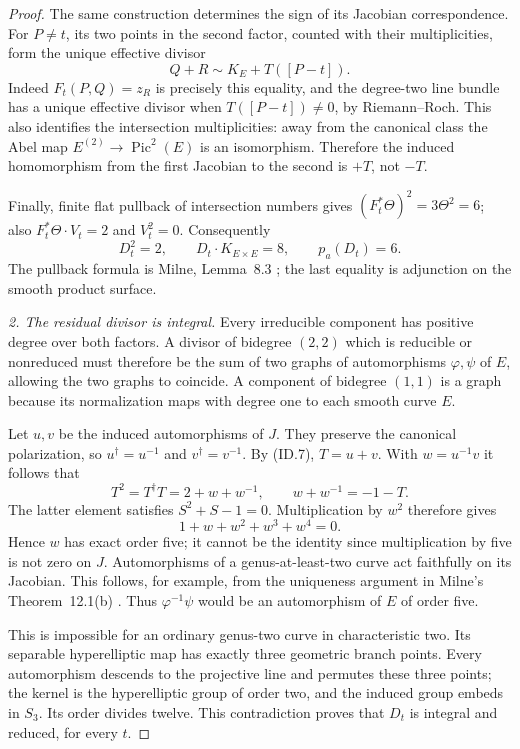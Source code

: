 \documentclass[11pt,a4paper]{article}
\begin{document}
\begin{proof}
The same construction determines the sign of its Jacobian
correspondence. For $P\ne t$, its two points in the second
factor, counted with their multiplicities, form the unique
effective divisor
\[
                   Q+R\sim K_E+T([P-t]).
 \tag{ID.7}
\]
Indeed $F_t(P,Q)=z_R$ is precisely this equality, and the
degree-two line bundle has a unique effective divisor when
$T([P-t])\ne0$, by Riemann--Roch. This also identifies the
intersection multiplicities: away from the canonical class
the Abel map $E^{(2)}\to\operatorname{Pic}^2(E)$ is an
isomorphism. Therefore the induced homomorphism from the
first Jacobian to the second is $+T$, not $-T$.

Finally, finite flat pullback of intersection numbers gives
$(F_t^*\Theta)^2=3\Theta^2=6$; also
$F_t^*\Theta\cdot V_t=2$ and $V_t^2=0$.
Consequently
\[
 D_t^2=2,\qquad
 D_t\cdot K_{E\times E}=8,\qquad p_a(D_t)=6.
 \tag{ID.8}
\]
The pullback formula is Milne, Lemma~8.3
\cite[p.~13]{MilneAV}; the last equality is adjunction on
the smooth product surface.

\emph{2. The residual divisor is integral.}
Every irreducible component has positive degree over both
factors. A divisor of bidegree $(2,2)$ which is reducible or
nonreduced must therefore be the sum of two graphs of
automorphisms $\varphi,\psi$ of $E$, allowing the two graphs
to coincide. A component of bidegree $(1,1)$ is a graph
because its normalization maps with degree one to each
smooth curve $E$.

Let $u,v$ be the induced automorphisms of $J$. They preserve
the canonical polarization, so $u^\dagger=u^{-1}$ and
$v^\dagger=v^{-1}$. By (ID.7), $T=u+v$. With
$w=u^{-1}v$ it follows that
\[
              T^2=T^\dagger T=2+w+w^{-1},
       \qquad w+w^{-1}=-1-T.
 \tag{ID.9}
\]
The latter element satisfies $S^2+S-1=0$. Multiplication
by $w^2$ therefore gives
\[
                  1+w+w^2+w^3+w^4=0.
 \tag{ID.10}
\]
Hence $w$ has exact order five; it cannot be the identity
since multiplication by five is not zero on $J$.
Automorphisms of a genus-at-least-two curve act faithfully
on its Jacobian. This follows, for example, from the
uniqueness argument in Milne's Theorem~12.1(b)
\cite[pp.~38--39]{MilneJV}.
Thus $\varphi^{-1}\psi$ would be an automorphism of $E$
of order five.

This is impossible for an ordinary genus-two curve in
characteristic two. Its separable hyperelliptic map has
exactly three geometric branch points. Every automorphism
descends to the projective line and permutes these three
points; the kernel is the hyperelliptic group of order two,
and the induced group embeds in $S_3$. Its order divides
twelve. This contradiction proves that $D_t$ is integral
and reduced, for every $t$.


\end{proof}
\end{document}
